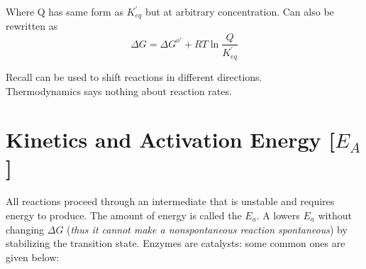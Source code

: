 \documentclass[../Bio_chemistryReview.tex]{subfiles}
\begin{document}
Where Q has same form as $ K_{eq}^{'} $ but at arbitrary concentration. Can also
be rewritten as 
\begin{equation}
  \boxed{\Delta G = \Delta G^{o\prime} + RT\ln \dfrac{Q}{K_{eq}^{\prime}}}
\end{equation}

Recall  can be used to shift reactions in
different directions.\\ Thermodynamics says nothing about reaction rates.

\section{Kinetics and Activation Energy [$ E_{A} $]}

All reactions proceed through an intermediate that is unstable and requires
energy to produce. The amount of energy is called the 
$ E_{a} $. A  lowers $ E_{a} $ without changing $ \Delta G $
(\emph{thus it cannot make a nonspontaneous reaction spontaneous}) by
stabilizing the transition state. Enzymes are catalysts: some common ones are
given below:
\end{document}
